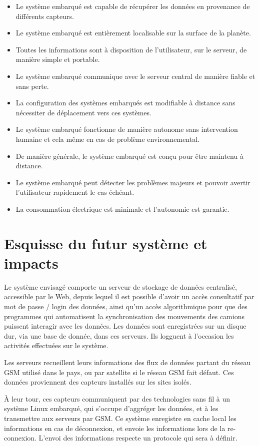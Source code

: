 \begin{itemize}
\item Le système embarqué est capable de récupérer les données en provenance de différents capteurs.
\item Le système embarqué est entièrement localisable sur la surface de la planète.
\item Toutes les informations sont à disposition de l’utilisateur, sur le serveur, de manière simple et portable.
\item Le système embarqué communique avec le serveur central de manière fiable et sans perte.
\item La configuration des systèmes embarqués est modifiable à distance sans nécessiter de déplacement vers ces systèmes.
\item Le système embarqué fonctionne de manière autonome sans intervention humaine et cela même en cas de problème environnemental.
\item De manière générale, le système embarqué est conçu pour être maintenu à distance.
\item Le système embarqué peut détecter les problèmes majeurs et pouvoir avertir l’utilisateur rapidement le cas échéant.
\item La consommation électrique est minimale et l’autonomie est garantie.
\end{itemize}

\section{Esquisse du futur système et impacts}

Le système envisagé comporte un serveur de stockage de données centralisé, accessible par le Web, depuis lequel il est possible d’avoir un accès consultatif par mot de passe / login des données, ainsi qu’un accès algorithmique pour que des programmes qui automatisent la synchronisation des mouvements des camions puissent interagir avec les données. Les données sont enregistrées sur un disque dur, via une base de donnée, dans ces serveurs. Ils logguent à l’occasion les activités effectuées sur le système.

Les serveurs recueillent leurs informations des flux de données partant du réseau GSM utilisé dans le pays, ou par satellite si le réseau GSM fait défaut. Ces données proviennent des capteurs installés sur les sites isolés.

À leur tour, ces capteurs communiquent par des technologies sans fil à un système Linux embarqué, qui s’occupe d’aggréger les données, et à les transmettre aux serveurs par GSM. Ce système enregistre en cache local les informations en cas de déconnexion, et envoie les informations lors de la re-connexion. L’envoi des informations respecte un protocole qui sera à définir.

